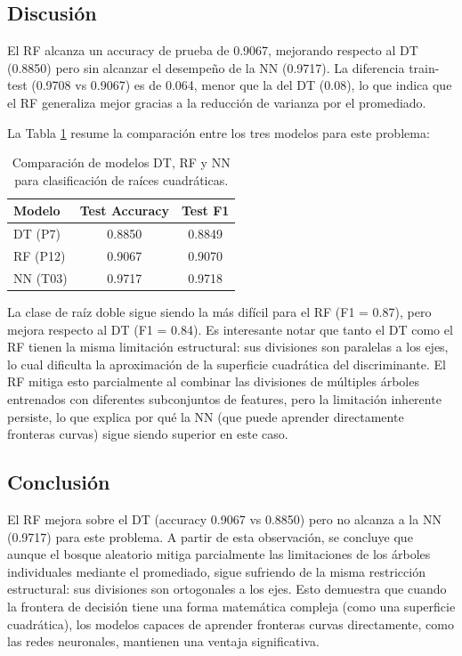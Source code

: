 \documentclass{article}
\begin{document}
\subsection{Discusión}

El RF alcanza un accuracy de prueba de 0.9067, mejorando respecto al DT (0.8850) pero sin alcanzar el desempeño de la NN (0.9717). La diferencia train-test (0.9708 vs 0.9067) es de 0.064, menor que la del DT (0.08), lo que indica que el RF generaliza mejor gracias a la reducción de varianza por el promediado.

La Tabla \ref{tab:p12_comparacion} resume la comparación entre los tres modelos para este problema:

\begin{table}[H]
\centering
\begin{tabular}{lcc}
\hline
\textbf{Modelo} & \textbf{Test Accuracy} & \textbf{Test F1} \\
\hline
DT (P7)   & 0.8850 & 0.8849 \\
RF (P12)  & 0.9067 & 0.9070 \\
NN (T03)  & 0.9717 & 0.9718 \\
\hline
\end{tabular}
\caption{Comparación de modelos DT, RF y NN para clasificación de raíces cuadráticas.}
\label{tab:p12_comparacion}
\end{table}

La clase de raíz doble sigue siendo la más difícil para el RF (F1 = 0.87), pero mejora respecto al DT (F1 = 0.84). Es interesante notar que tanto el DT como el RF tienen la misma limitación estructural: sus divisiones son paralelas a los ejes, lo cual dificulta la aproximación de la superficie cuadrática del discriminante. El RF mitiga esto parcialmente al combinar las divisiones de múltiples árboles entrenados con diferentes subconjuntos de features, pero la limitación inherente persiste, lo que explica por qué la NN (que puede aprender directamente fronteras curvas) sigue siendo superior en este caso.

\subsection{Conclusión}

El RF mejora sobre el DT (accuracy 0.9067 vs 0.8850) pero no alcanza a la NN (0.9717) para este problema. A partir de esta observación, se concluye que aunque el bosque aleatorio mitiga parcialmente las limitaciones de los árboles individuales mediante el promediado, sigue sufriendo de la misma restricción estructural: sus divisiones son ortogonales a los ejes. Esto demuestra que cuando la frontera de decisión tiene una forma matemática compleja (como una superficie cuadrática), los modelos capaces de aprender fronteras curvas directamente, como las redes neuronales, mantienen una ventaja significativa.




\end{document}
